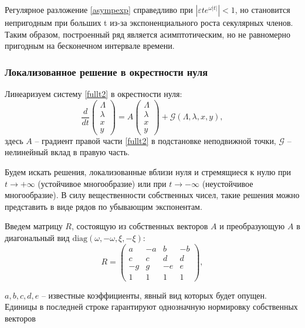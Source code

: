 Регулярное разложение \eqref{asympexp} справедливо при $|\varepsilon t e^{\omega |t|}| < 1$, но становится непригодным при больших t из-за экспоненциального роста секулярных членов. Таким образом, построенный ряд является асимптотическим, но не равномерно пригодным на бесконечном интервале времени.

\subsubsection{Локализованное решение в окрестности нуля}

Линеаризуем систему \eqref{fullt2} в окрестности нуля:
\begin{equation}
    \frac{d}{dt} \begin{pmatrix} \Lambda\\ \lambda \\x \\y\end{pmatrix} = A \begin{pmatrix} \Lambda\\ \lambda \\x \\y\end{pmatrix} + \mathcal{G}(\Lambda,\lambda,x,y),
\end{equation}
здесь $A$ -- градиент правой части \eqref{fullt2} в подстановке неподвижной точки, $\mathcal{G}$ -- нелинейный вклад в правую часть.

Будем искать решения, локализованные вблизи нуля и стремящиеся к нулю при $t \to +\infty$ (устойчивое многообразие) или при $t \to -\infty$ (неустойчивое многообразие). В силу вещественности собственных чисел, такие решения можно представить в виде рядов по убывающим экспонентам. 

Введем матрицу $R$, состоящую из собственных векторов $A$ и преобразующую $A$ в диагональный вид $\text{diag} (\omega, -\omega, \xi, -\xi)$:
\begin{equation}
R = \begin{pmatrix}
    a & -a & b & -b \\
    c & c & d & d \\
    -g & g & -e & e \\
    1 & 1 & 1 & 1
    \end{pmatrix},
\end{equation}

$a,b,c,d,e$ -- известные коэффициенты, явный вид которых будет опущен. Единицы в последней строке гарантируют однозначную нормировку собственных векторов

